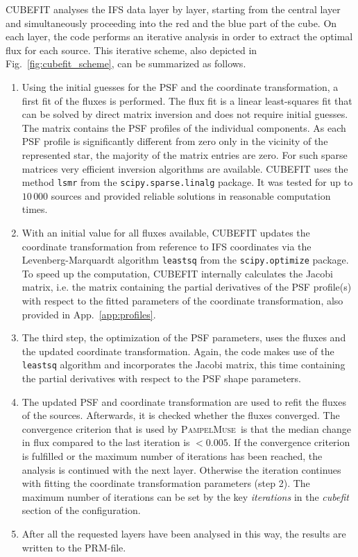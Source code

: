 \documentclass[a4paper,10pt]{article}
\newcommand{\pmparameter}[5]{\begin{center}\framebox{\begin{tabularx}{.95\linewidth}{c c c X} \textbf{#1}|\textbf{#2} & type=\textit{#3} & default=#4 & \footnotesize{\textcolor{light-gray}{#5}}\end{tabularx}}\end{center}}
\newcommand{\pampelmuse}{\textsc{PampelMuse}\ }
\begin{document}
CUBEFIT analyses the IFS data layer by layer, starting from the central layer and simultaneously proceeding into the red and the blue part of the cube. On each layer, the code performs an iterative analysis in order to extract the optimal flux for each source. This iterative scheme, also depicted in Fig.~\ref{fig:cubefit_scheme}, can be summarized as follows.
\begin{enumerate}
 \item Using the initial guesses for the PSF and the coordinate transformation, a first fit of the fluxes is performed. The flux fit is a linear least-squares fit that can be solved by direct matrix inversion and does not require initial guesses. The matrix contains the PSF profiles of the individual components. As each PSF profile is significantly different from zero only in the vicinity of the represented star, the majority of the matrix entries are zero. For such sparse matrices very efficient inversion algorithms are available. CUBEFIT uses the method \texttt{lsmr} \citep{2010arXiv1006.0758F} from the \texttt{scipy.sparse.linalg} package. It was tested for up to $10\,000$ sources and provided reliable solutions in reasonable computation times.
 \item With an initial value for all fluxes available, CUBEFIT updates the coordinate transformation from reference to IFS coordinates via the Levenberg-Marquardt algorithm \texttt{leastsq} from the \texttt{scipy.optimize} package. To speed up the computation, CUBEFIT internally calculates the Jacobi matrix, i.e. the matrix containing the partial derivatives of the PSF profile(s) with respect to the fitted parameters of the coordinate transformation, also provided in App.~\ref{app:profiles}.
 \item The third step, the optimization of the PSF parameters, uses the fluxes and the updated coordinate transformation. Again, the code makes use of the \texttt{leastsq} algorithm and incorporates the Jacobi matrix, this time containing the partial derivatives with respect to the PSF shape parameters.
 \item The updated PSF and coordinate transformation are used to refit the fluxes of the sources. Afterwards, it is checked whether the fluxes converged. The convergence criterion that is used by \pampelmuse is that the median change in flux compared to the last iteration is $<0.005$. If the convergence criterion is fulfilled or the maximum number of iterations has been reached, the analysis is continued with the next layer. Otherwise the iteration continues with fitting the coordinate transformation parameters (step 2). The maximum number of iterations can be set by the key \emph{iterations} in the \emph{cubefit} section of the configuration.
 \pmparameter{cubefit}{iterations}{integer}{$10$}{The maximum number of iterations that is performed by CUBEFIT on an individual layer of the IFS data.}
 \item After all the requested layers have been analysed in this way, the results are written to the PRM-file.
\end{enumerate}
\end{document}
